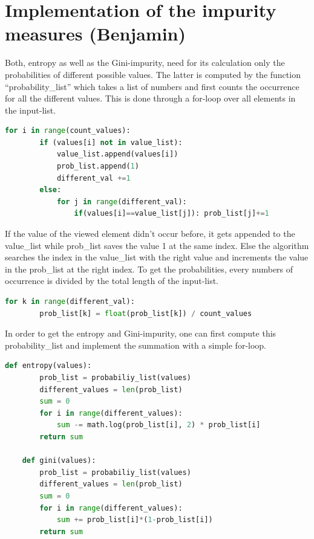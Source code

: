 \documentclass[12pt,a4paper]{scrartcl}		%
\begin{document}
\section{Implementation of the impurity measures (Benjamin)}
Both, entropy as well as the Gini-impurity, need for its calculation only the probabilities of different 
possible values. The latter is computed by the function “probability\_list” which takes a list of numbers 
and first counts the occurrence for all the different values. This is done through a for-loop over all 
elements in the input-list. 

\begin{lstlisting}[language=Python]
    for i in range(count_values):
        if (values[i] not in value_list): 
            value_list.append(values[i])
            prob_list.append(1)
            different_val +=1
        else:
            for j in range(different_val):
                if(values[i]==value_list[j]): prob_list[j]+=1
\end{lstlisting}
 
If the value of the viewed element didn’t occur before, it gets appended to the value\_list while prob\_list 
saves the value 1 at the same index. Else the algorithm searches the index in the value\_list with the right 
value and increments the value in the prob\_list at the right index. 
To get the probabilities, every numbers of occurrence is divided by the total length of the input-list.

\begin{lstlisting}[language=Python]
    for k in range(different_val):
        prob_list[k] = float(prob_list[k]) / count_values
\end{lstlisting}

In order to get the entropy and Gini-impurity, one can first compute this probability\_list and implement 
the summation with a simple for-loop.

\begin{lstlisting}[language=Python]
    def entropy(values):
        prob_list = probabiliy_list(values)
        different_values = len(prob_list)
        sum = 0
        for i in range(different_values):
            sum -= math.log(prob_list[i], 2) * prob_list[i]
        return sum

    def gini(values):
        prob_list = probabiliy_list(values)
        different_values = len(prob_list)
        sum = 0
        for i in range(different_values):
            sum += prob_list[i]*(1-prob_list[i])
        return sum
\end{lstlisting}
\end{document}
